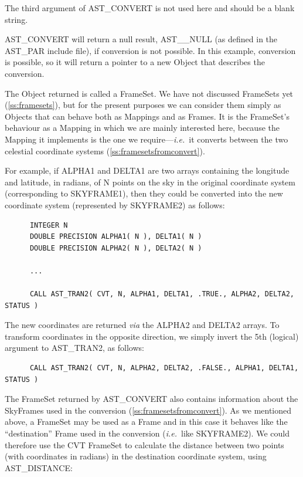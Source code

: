 \documentclass[twoside,11pt]{article}
\newcommand{\htmlref}[2]{#1}
\newcommand{\secref}[1]{\S\ref{#1}}
\renewcommand{\secref}[1]{\ref{#1}}
\begin{document}
The third argument of AST\_CONVERT is not used here and should be a
blank string.

AST\_CONVERT will return a null result, AST\_\_NULL (as defined in the
AST\_PAR include file), if conversion is not possible. In this
example, conversion is possible, so it will return a pointer to a new
\htmlref{Object}{Object} that describes the conversion.

The Object returned is called a \htmlref{FrameSet}{FrameSet}. We have not discussed
FrameSets yet (\secref{ss:framesets}), but for the present purposes we
can consider them simply as Objects that can behave both as Mappings
and as Frames. It is the FrameSet's behaviour as a \htmlref{Mapping}{Mapping} in which we
are mainly interested here, because the Mapping it implements is the
one we require---{\em{i.e.}}\ it converts between the two celestial
coordinate systems (\secref{ss:framesetsfromconvert}).

For example, if ALPHA1 and DELTA1 are two arrays containing the
longitude and latitude, in radians, of N points on the sky in the
original coordinate system (corresponding to SKYFRAME1), then they
could be converted into the new coordinate system (represented by
SKYFRAME2) as follows:

\small
\begin{verbatim}
      INTEGER N
      DOUBLE PRECISION ALPHA1( N ), DELTA1( N )
      DOUBLE PRECISION ALPHA2( N ), DELTA2( N )

      ...

      CALL AST_TRAN2( CVT, N, ALPHA1, DELTA1, .TRUE., ALPHA2, DELTA2, STATUS )
\end{verbatim}
\normalsize

The new coordinates are returned {\em{via}} the ALPHA2 and DELTA2
arrays.  To transform coordinates in the opposite direction, we simply
invert the 5th (logical) argument to \htmlref{AST\_TRAN2}{AST_TRAN2}, as follows:

\small
\begin{verbatim}
      CALL AST_TRAN2( CVT, N, ALPHA2, DELTA2, .FALSE., ALPHA1, DELTA1, STATUS )
\end{verbatim}
\normalsize

The FrameSet returned by AST\_CONVERT also contains information about
the SkyFrames used in the conversion
(\secref{ss:framesetsfromconvert}). As we mentioned above, a FrameSet
may be used as a \htmlref{Frame}{Frame} and in this case it behaves like the
``destination'' Frame used in the conversion ({\em{i.e.}}\ like
SKYFRAME2). We could therefore use the CVT FrameSet to calculate the
distance between two points (with coordinates in radians) in the
destination coordinate system, using \htmlref{AST\_DISTANCE}{AST_DISTANCE}:
\end{document}
